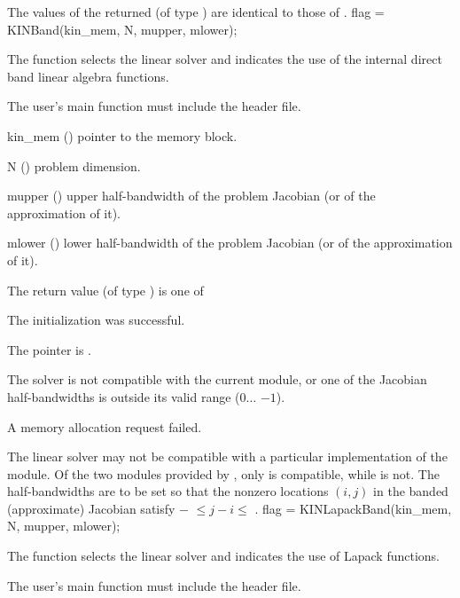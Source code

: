 {
  The values of the returned  (of type ) are identical
  to those of .
}
{}
{
  flag = KINBand(kin\_mem, N, mupper, mlower);
}
{
  The function  selects the {\kinband} linear solver and indicates
  the use of the internal direct band linear algebra functions.

  The user's main function must include the  header file.
}
{
  \begin{args}
  \item[kin\_mem] ()
    pointer to the {\kinsol} memory block.
  \item[N] ()
    problem dimension.
  \item[mupper] ()
    upper half-bandwidth of the problem Jacobian (or of the approximation of it).
  \item[mlower] ()
    lower half-bandwidth of the problem Jacobian (or of the approximation of it).
  \end{args}
}
{
  The return value  (of type ) is one of
  \begin{args}
  \item[\Id{KINDLS\_SUCCESS}] 
    The {\kinband} initialization was successful.
  \item[\Id{KINDLS\_MEM\_NULL}]
    The  pointer is .
  \item[\Id{KINDLS\_ILL\_INPUT}]
    The {\kinband} solver is not compatible with the current {\nvector} module, or
    one of the Jacobian half-bandwidths is outside its valid range
    ($0 \ldots$ $-1$).
  \item[\Id{KINDLS\_MEM\_FAIL}]
    A memory allocation request failed.
  \end{args}
}
{
  The {\kinband} linear solver may not be compatible with a particular
  implementation of the {\nvector} module. Of the two {\nvector} modules 
  provided by {\sundials}, only {\nvecs} is compatible, while {\nvecp} is not.
  The half-bandwidths are to be set so that the nonzero locations $(i,j)$ in the
  banded (approximate) Jacobian satisfy $-$ $\leq j-i \leq$ .
}
{
  flag = KINLapackBand(kin\_mem, N, mupper, mlower);
}
{
  The function  selects the {\kinband} linear solver and
  indicates the use of Lapack functions. 

  The user's main function must include the  header file.
}
